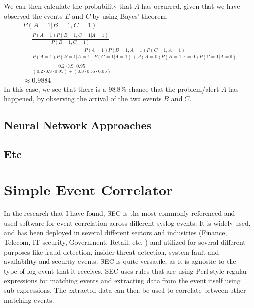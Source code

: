 We can then calculate the probability that $A$ has occurred, given that we have observed the events $B$ and $C$ by using Bayes' theorem.
\begin{align*}
    &P(A=1 | B=1, C=1)\\
    &=\frac{P(A=1)P(B=1,C=1|A=1)}{P(B=1,C=1)}\\
    &=\frac{P(A=1)P(B=1,A=1)P(C=1,A=1)}{P(A=1)P(B=1|A=1)P(C=1|A=1)+P(A=0)P(B=1|A=0)P(C=1|A=0)}\\
    &=\frac{0.2\cdot0.9\cdot0.95}{(0.2\cdot0.9\cdot0.95)+(0.8\cdot0.05\cdot0.05)}\\
    &\approx 0.9884
\end{align*}
In this case, we see that there is a 98.8\% chance that the problem/alert $A$ has happened, by observing the arrival of the two events $B$ and $C$.


\subsection{Neural Network Approaches}
\subsection{Etc}


\section{Simple Event Correlator}
\label{sec:SEC}

In the research that I have found, SEC is the most commonly referenced and used software for event correlation across different syslog events. It is widely used, and has been deployed in several different sectors and industries (Finance, Telecom, IT security, Government, Retail, etc. \textcite{vaarandi2005tools}) and utilized for several different purposes like fraud detection, insider-threat detection, system fault and availability and security events. SEC is quite versatile, as it is agnostic to the type of log event that it receives. SEC uses rules that are using Perl-style regular expressions for matching events and extracting data from the event itself using sub-expressions. The extracted data can then be used to correlate between other matching events.

